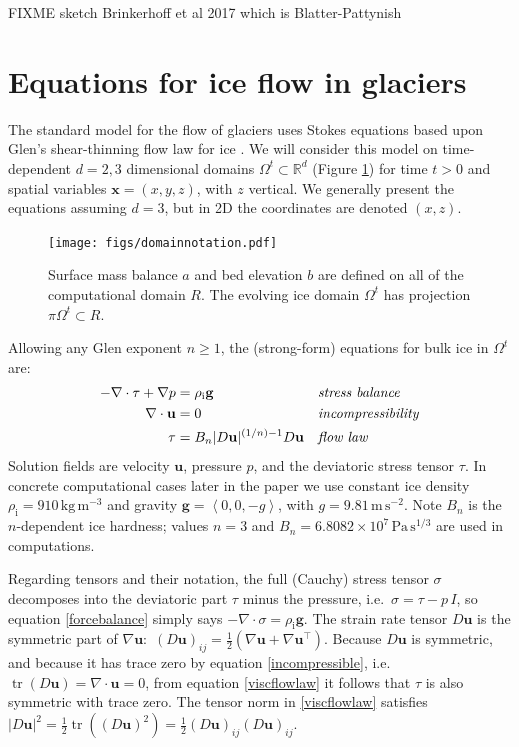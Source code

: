 \documentclass[letterpaper,final,12pt,reqno]{amsart}
\newcommand{\RR}{\mathbb{R}}
\newcommand{\grad}{\nabla}
\newcommand{\Div}{\nabla\cdot}
\newcommand{\trace}{\operatorname{tr}}
\newcommand{\bg}{\mathbf{g}}
\newcommand{\bu}{\mathbf{u}}
\newcommand{\bx}{\mathbf{x}}
\newcommand{\rhoi}{\rho_{\text{i}}}
\begin{document}
FIXME sketch Brinkerhoff et al 2017 \cite{Brinkerhoffetal2017} which is Blatter-Pattynish


\section{Equations for ice flow in glaciers} \label{sec:strongform}

The standard model for the flow of glaciers uses Stokes equations based upon Glen's shear-thinning flow law for ice \cite{GreveBlatter2009,JouvetRappaz2011,SchoofHewitt2013}.  We will consider this model on time-dependent $d=2,3$ dimensional domains $\Omega^t \subset \RR^d$ (Figure \ref{fig:domainnotation}) for time $t>0$ and spatial variables $\bx=(x,y,z)$, with $z$ vertical.  We generally present the equations assuming $d=3$, but in 2D the coordinates are denoted $(x,z)$.

\begin{figure}[ht]
\begin{center}
\texttt{[image: figs/domainnotation.pdf]}
\end{center}
\caption{Surface mass balance $a$ and bed elevation $b$ are defined on all of the computational domain $R$.  The evolving ice domain $\Omega^t$ has projection $\pi \Omega^t \subset R$.}
\label{fig:domainnotation}
\end{figure}

Allowing any Glen exponent $n\ge 1$, the (strong-form) equations for bulk ice in $\Omega^t$ are:
\begin{align}
- \nabla \cdot \tau + \nabla p &= \rhoi \bg &&\text{\emph{stress balance}} \label{forcebalance} \\
\nabla \cdot \bu &= 0 &&\text{\emph{incompressibility}} \label{incompressible} \\
\tau &= B_n |D\bu|^{(1/n) - 1} D\bu  &&\text{\emph{flow law}} \label{viscflowlaw}
\end{align}
Solution fields are velocity $\bu$, pressure $p$, and the deviatoric stress tensor $\tau$.  In concrete computational cases later in the paper we use constant ice density $\rhoi=910 \,\text{kg}\,\text{m}^{-3}$ and gravity $\bg=\left<0,0,-g\right>$, with $g=9.81\,\text{m}\,\text{s}^{-2}$.  Note $B_n$ is the $n$-dependent ice hardness; values $n=3$ and $B_n=6.8082\times 10^7\,\text{Pa}\,\text{s}^{1/3}$ \cite{Bueleretal2005} are used in computations.

Regarding tensors and their notation, the full (Cauchy) stress tensor $\sigma$ \cite{GreveBlatter2009} decomposes into the deviatoric part $\tau$ minus the pressure, i.e.~$\sigma = \tau - p\,I$, so equation \eqref{forcebalance} simply says $-\Div \sigma = \rhoi \bg$.  The strain rate tensor $D\bu$ is the symmetric part of $\grad \bu$: \,$(D\bu)_{ij} = \frac{1}{2} \left(\grad\bu + \grad\bu^\top\right)$.  Because $D\bu$ is symmetric, and because it has trace zero by equation \eqref{incompressible}, i.e.~$\trace(D\bu)=\nabla \cdot \bu = 0$, from equation \eqref{viscflowlaw} it follows that $\tau$ is also symmetric with trace zero.  The tensor norm in \eqref{viscflowlaw} satisfies $|D\bu|^2 = \frac{1}{2} \trace\left((D\bu)^2\right) = \frac{1}{2} (D\bu)_{ij} (D\bu)_{ij}$.
\end{document}
